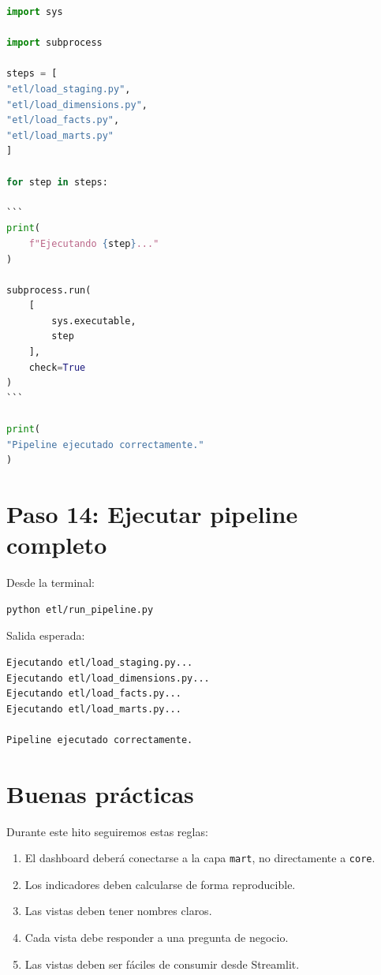 \begin{lstlisting}[language=Python]
import sys

import subprocess

steps = [
"etl/load_staging.py",
"etl/load_dimensions.py",
"etl/load_facts.py",
"etl/load_marts.py"
]

for step in steps:

```
print(
    f"Ejecutando {step}..."
)

subprocess.run(
    [
        sys.executable,
        step
    ],
    check=True
)
```

print(
"Pipeline ejecutado correctamente."
)
\end{lstlisting}

\section{Paso 14: Ejecutar pipeline completo}

Desde la terminal:

\begin{lstlisting}[language=bash]
python etl/run_pipeline.py
\end{lstlisting}

Salida esperada:

\begin{verbatim}
Ejecutando etl/load_staging.py...
Ejecutando etl/load_dimensions.py...
Ejecutando etl/load_facts.py...
Ejecutando etl/load_marts.py...

Pipeline ejecutado correctamente.
\end{verbatim}

\section{Buenas prácticas}

Durante este hito seguiremos estas reglas:

\begin{enumerate}
\item El dashboard deberá conectarse a la capa \texttt{mart}, no directamente a \texttt{core}.
\item Los indicadores deben calcularse de forma reproducible.
\item Las vistas deben tener nombres claros.
\item Cada vista debe responder a una pregunta de negocio.
\item Las vistas deben ser fáciles de consumir desde Streamlit.
\end{enumerate}

